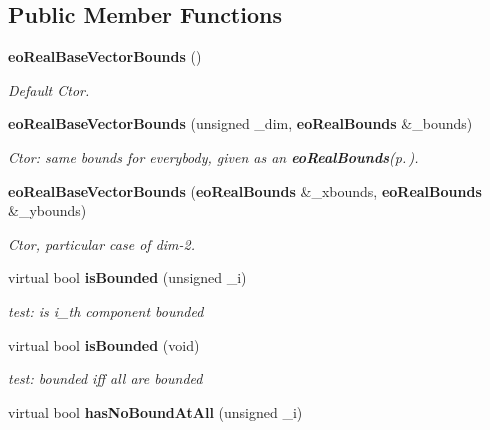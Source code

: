 \subsection*{Public Member Functions}
\begin{CompactItemize}
\item 
{\bf eo\-Real\-Base\-Vector\-Bounds} ()\label{classeo_real_base_vector_bounds_a1}

\begin{CompactList}\small\item\em Default Ctor. \item\end{CompactList}\item 
{\bf eo\-Real\-Base\-Vector\-Bounds} (unsigned \_\-dim, {\bf eo\-Real\-Bounds} \&\_\-bounds)\label{classeo_real_base_vector_bounds_a2}

\begin{CompactList}\small\item\em Ctor: same bounds for everybody, given as an {\bf eo\-Real\-Bounds}{\rm (p.\,\pageref{classeo_real_bounds})}. \item\end{CompactList}\item 
{\bf eo\-Real\-Base\-Vector\-Bounds} ({\bf eo\-Real\-Bounds} \&\_\-xbounds, {\bf eo\-Real\-Bounds} \&\_\-ybounds)\label{classeo_real_base_vector_bounds_a3}

\begin{CompactList}\small\item\em Ctor, particular case of dim-2. \item\end{CompactList}\item 
virtual bool {\bf is\-Bounded} (unsigned \_\-i)\label{classeo_real_base_vector_bounds_a4}

\begin{CompactList}\small\item\em test: is i\_\-th component bounded \item\end{CompactList}\item 
virtual bool {\bf is\-Bounded} (void)\label{classeo_real_base_vector_bounds_a5}

\begin{CompactList}\small\item\em test: bounded iff all are bounded \item\end{CompactList}\item 
virtual bool {\bf has\-No\-Bound\-At\-All} (unsigned \_\-i)\label{classeo_real_base_vector_bounds_a6}


\end{CompactItemize}
